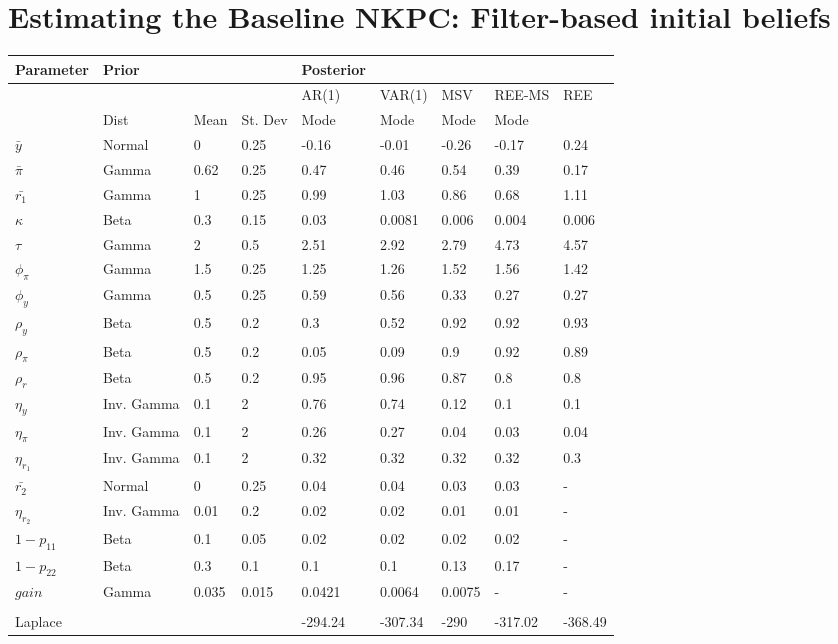 \documentclass[12pt,reqno]{article}
\numberwithin{equation}{section}
\begin{document}
\section*{Estimating the Baseline NKPC: Filter-based initial beliefs} 



\begin{table}[H]
\begin{tabular}{l||lll||l|l|l|ll}
Parameter & Prior &  &  & Posterior &  &  &  &  \\
\hline
\hline
 &  &  &  & AR(1) & VAR(1) & MSV & REE-MS & REE \\
\hline
\hline
 & Dist & Mean & St. Dev & Mode & Mode & Mode & Mode &  \\
$\bar{y}$ & Normal & 0 & 0.25 & -0.16 & -0.01 & -0.26 & -0.17 & 0.24 \\
$\bar{\pi}$ & Gamma & 0.62 & 0.25 & 0.47 & 0.46 & 0.54 & 0.39 & 0.17 \\
$\bar{r_1}$ & Gamma & 1 & 0.25 & 0.99 & 1.03 & 0.86 & 0.68 & 1.11 \\
$\kappa$ & Beta & 0.3 & 0.15 & 0.03 & 0.0081 & 0.006 & 0.004 & 0.006 \\
$\tau$ & Gamma & 2 & 0.5 & 2.51 & 2.92 & 2.79 & 4.73 & 4.57 \\
$\phi_{\pi}$ & Gamma & 1.5 & 0.25 & 1.25 & 1.26 & 1.52 & 1.56 & 1.42 \\
$\phi_y$ & Gamma & 0.5 & 0.25 & 0.59 & 0.56 & 0.33 & 0.27 & 0.27 \\
$\rho_y$ & Beta & 0.5 & 0.2 & 0.3 & 0.52 & 0.92 & 0.92 & 0.93 \\
$\rho_{\pi}$ & Beta & 0.5 & 0.2 & 0.05 & 0.09 & 0.9 & 0.92 & 0.89 \\
$\rho_r$ & Beta & 0.5 & 0.2 & 0.95 & 0.96 & 0.87 & 0.8 & 0.8 \\
$\eta_y$ & Inv. Gamma & 0.1 & 2 & 0.76 & 0.74 & 0.12 & 0.1 & 0.1 \\
$\eta_{\pi}$ & Inv. Gamma & 0.1 & 2 & 0.26 & 0.27 & 0.04 & 0.03 & 0.04 \\
$\eta_{r_1}$ & Inv. Gamma & 0.1 & 2 & 0.32 & 0.32 & 0.32 & 0.32 & 0.3 \\
$\bar{r_2}$ & Normal & 0 & 0.25 & 0.04 & 0.04 & 0.03 & 0.03 & - \\
$\eta_{r_2}$ & Inv. Gamma & 0.01 & 0.2 & 0.02 & 0.02 & 0.01 & 0.01 & - \\
$1-p_{11}$ & Beta & 0.1 & 0.05 & 0.02 & 0.02 & 0.02 & 0.02 & - \\
$1-p_{22}$ & Beta & 0.3 & 0.1 & 0.1 & 0.1 & 0.13 & 0.17 & - \\
$gain$ & Gamma & 0.035 & 0.015 & 0.0421 & 0.0064 & 0.0075 & - & - \\
 &  &  &  &  &  &  &  &  \\
Laplace &  &  &  & -294.24 & -307.34 & -290 & -317.02 & -368.49
\end{tabular}
\end{table}
\end{document}
